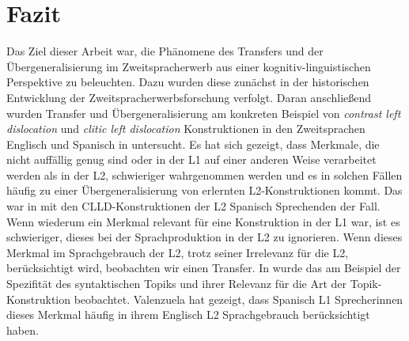 \section{Fazit}

\begin{comment}
    * Einleitung und Fazit müssen zusammenpassen.
    * sind die Erkenntnisse im Fazit aus der Arbeit ableitbar?
    * Vorgehensweise zusammenfassen

Kritische Zusammenfassung
\begin{itemize}
    \item was war in den Texten nicht so gelungen?
    \item welche Fragen sind offen geblieben?
    \item in welche Richtung kann noch weiter geforscht werden?
    \item was sind gegnerische Meinungen zum Thema?
\end{itemize}
\end{comment}


Das Ziel dieser Arbeit war, die Phänomene des Transfers und der Übergeneralisierung im Zweitspracherwerb aus einer kognitiv-linguistischen Perspektive zu beleuchten.
Dazu wurden diese zunächst in der historischen Entwicklung der Zweitspracherwerbsforschung verfolgt.
Daran anschließend wurden Transfer und Übergeneralisierung am konkreten Beispiel von \textit{contrast left dislocation} und \textit{clitic left dislocation} Konstruktionen in den Zweitsprachen Englisch und Spanisch in \cite{Valenzuela05} untersucht.
Es hat sich gezeigt, dass Merkmale, die nicht auffällig genug sind oder in der L1 auf einer anderen Weise verarbeitet werden als in der L2, schwieriger wahrgenommen werden
und es in solchen Fällen häufig zu einer Übergeneralisierung von erlernten L2-Konstruktionen kommt.
Das war in \cite{Valenzuela05} mit den CLLD-Konstruktionen der L2 Spanisch Sprechenden der Fall.
Wenn wiederum ein Merkmal relevant für eine Konstruktion in der L1 war, ist es schwieriger, dieses bei der Sprachproduktion in der L2 zu ignorieren.
Wenn dieses Merkmal im Sprachgebrauch der L2, trotz seiner Irrelevanz für die L2, berücksichtigt wird, beobachten wir einen Transfer.
In \cite{Valenzuela05} wurde das am Beispiel der Spezifität des syntaktischen Topiks und ihrer Relevanz für die Art der Topik-Konstruktion beobachtet.
Valenzuela hat gezeigt, dass Spanisch L1 Sprecherinnen dieses Merkmal häufig in ihrem Englisch L2 Sprachgebrauch berücksichtigt haben.

